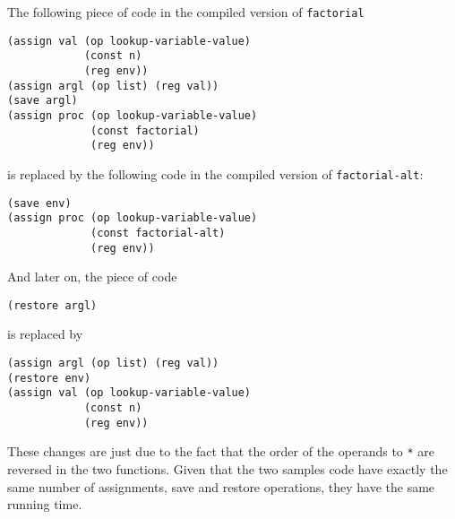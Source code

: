 \documentclass[a4paper,12pt]{article}
\begin{document}
The following piece of code in the compiled version of \lstinline!factorial!
\begin{lstlisting}
(assign val (op lookup-variable-value)
            (const n)
            (reg env))
(assign argl (op list) (reg val))
(save argl)
(assign proc (op lookup-variable-value)
             (const factorial)
             (reg env))
\end{lstlisting}

is replaced by the following code in the compiled version of
\lstinline!factorial-alt!:
\begin{lstlisting}
(save env)
(assign proc (op lookup-variable-value)
             (const factorial-alt)
             (reg env))
\end{lstlisting}

And later on, the piece of code
\begin{lstlisting}
(restore argl)
\end{lstlisting}

is replaced by

\begin{lstlisting}
(assign argl (op list) (reg val))
(restore env)
(assign val (op lookup-variable-value)
            (const n)
            (reg env))
\end{lstlisting}

These changes are just due to the fact that the order of the operands
to \lstinline!*! are reversed in the two functions.  Given that the
two samples code have exactly the same number of assignments, save and
restore operations, they have the same running time.
\end{document}
